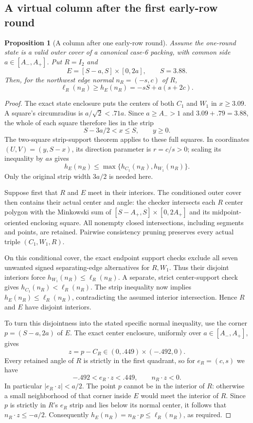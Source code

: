 \documentclass[11pt]{article}
\newtheorem{proposition}[theorem]{Proposition}
\begin{document}
\subsection{A virtual column after the first early-row round}\label{app:early-column}
\begin{proposition}[A column after one early-row round]\label{lem:row-state-column}
Assume the one-round state is a valid outer cover of a canonical case-6
packing, with common side $a\in[A_-,A_+]$. Put $R=I_2$ and
\[
 E=[S-a,S]\times[0,2a],\qquad S=3.88.
\]
Then, for the northwest edge normal $n_R=(-s,c)$ of $R$,
\[
 \ell_R(n_R)\ge h_E(n_R)=-sS+a(s+2c).
\]
\end{proposition}
\begin{proof}
The exact state enclosure puts the centers of both $C_1$ and $W_1$
in $x\ge3.09$. A square's circumradius is $a/\sqrt2<.71a$.
Since $a\ge A_->1$ and $3.09+.79=3.88$, the whole of each square
therefore lies in the strip
\[
 S-3a/2<x\le S,\qquad y\ge0.
\]
The two-square strip-support theorem applies to these full squares.
In coordinates $(U,V)=(y,S-x)$, its direction parameter is $r=c/s>0$;
scaling its inequality by $as$ gives
\[
 h_E(n_R)\le\max\{h_{C_1}(n_R),h_{W_1}(n_R)\}.
\]
Only the original strip width $3a/2$ is needed here.

Suppose first that $R$ and $E$ meet in their interiors.
The conditioned outer cover then contains their actual center and angle:
the checker intersects each $R$ center polygon with the Minkowski sum
of $[S-A_+,S]\times[0,2A_+]$ and its midpoint-oriented enclosing square.
All nonempty closed intersections, including segments and points, are
retained. Pairwise consistency pruning preserves every actual triple
$(C_1,W_1,R)$.

On this conditional cover, the exact endpoint support checks exclude
all seven unwanted signed separating-edge alternatives for $R,W_1$.
Thus their disjoint interiors force
$h_{W_1}(n_R)\le\ell_R(n_R)$.
A separate, strict center-support check gives
$h_{C_1}(n_R)<\ell_R(n_R)$.
The strip inequality now implies $h_E(n_R)\le\ell_R(n_R)$,
contradicting the assumed interior intersection. Hence $R$ and $E$
have disjoint interiors.

To turn this disjointness into the stated specific normal inequality,
use the corner $p=(S-a,2a)$ of $E$.
The exact center enclosure, uniformly over $a\in[A_-,A_+]$, gives
\[
 z=p-C_R\in(0,.449)\times(-.492,0).
\]
Every retained angle of $R$ is strictly in the first quadrant, so
for $e_R=(c,s)$ we have
\[
 -.492<e_R\cdot z<.449,
 \qquad n_R\cdot z<0.
\]
In particular $|e_R\cdot z|<a/2$.
The point $p$ cannot be in the interior of $R$: otherwise a small
neighborhood of that corner inside $E$ would meet the interior of $R$.
Since $p$ is strictly in $R$'s $e_R$ strip and lies below its normal
center, it follows that $n_R\cdot z\le-a/2$.
Consequently $h_E(n_R)=n_R\cdot p\le\ell_R(n_R)$, as required.
\end{proof}
\end{document}
